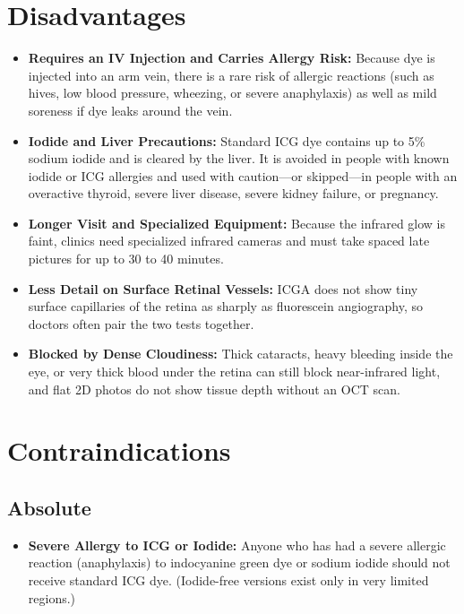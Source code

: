 \section{Disadvantages}

\begin{itemize}
    \item \textbf{Requires an IV Injection and Carries Allergy Risk:} Because dye is injected into an arm vein, there is a rare risk of allergic reactions (such as hives, low blood pressure, wheezing, or severe anaphylaxis) as well as mild soreness if dye leaks around the vein.
    \item \textbf{Iodide and Liver Precautions:} Standard ICG dye contains up to 5\% sodium iodide and is cleared by the liver. It is avoided in people with known iodide or ICG allergies and used with caution---or skipped---in people with an overactive thyroid, severe liver disease, severe kidney failure, or pregnancy.
    \item \textbf{Longer Visit and Specialized Equipment:} Because the infrared glow is faint, clinics need specialized infrared cameras and must take spaced late pictures for up to 30 to 40 minutes.
    \item \textbf{Less Detail on Surface Retinal Vessels:} ICGA does not show tiny surface capillaries of the retina as sharply as fluorescein angiography, so doctors often pair the two tests together.
    \item \textbf{Blocked by Dense Cloudiness:} Thick cataracts, heavy bleeding inside the eye, or very thick blood under the retina can still block near-infrared light, and flat 2D photos do not show tissue depth without an OCT scan.
\end{itemize}

\section{Contraindications}

\subsection{Absolute}

\begin{itemize}
    \item \textbf{Severe Allergy to ICG or Iodide:} Anyone who has had a severe allergic reaction (anaphylaxis) to indocyanine green dye or sodium iodide should not receive standard ICG dye. (Iodide-free versions exist only in very limited regions.)
\end{itemize}

